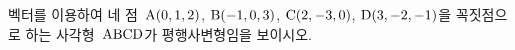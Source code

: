 벡터를 이용하여 네 점~$\mathrm{A}(0{,}\mkern3mu\mathopen{}1{,}\mkern3mu\mathopen{}2)$, $\mathrm{B}(-1{,}\mkern3mu\mathopen{}0{,}\mkern3mu\mathopen{}3)$, $\mathrm{C}(2{,}\mkern3mu\mathopen{}-3{,}\mkern3mu\mathopen{}0)$, $\mathrm{D}(3{,}\mkern3mu\mathopen{}-2{,}\mkern3mu\mathopen{}-1)$을 꼭짓점으로 하는 사각형~$\mathrm{ABCD}$가 평행사변형임을 보이시오.
